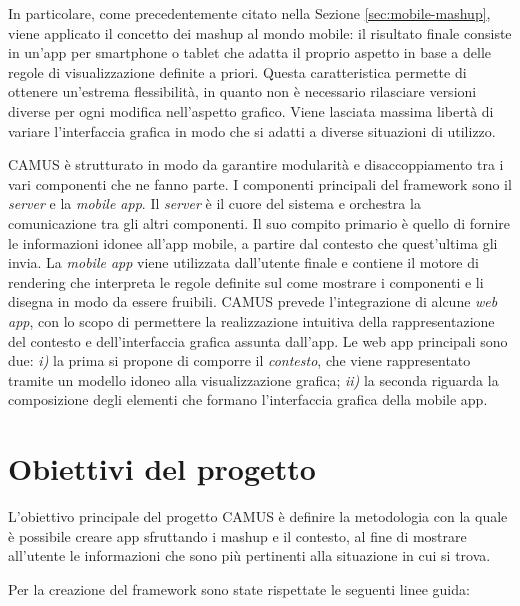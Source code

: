In particolare, come precedentemente citato nella Sezione \ref{sec:mobile-mashup}, viene applicato il concetto dei mashup al mondo mobile: il risultato finale consiste in un'app per smartphone o tablet che adatta il proprio aspetto in base a delle regole di visualizzazione definite a priori. Questa caratteristica permette di ottenere un'estrema flessibilità, in quanto non è necessario rilasciare versioni diverse per ogni modifica nell'aspetto grafico. Viene lasciata massima libertà di variare l'interfaccia grafica in modo che si adatti a diverse situazioni di utilizzo.

CAMUS è strutturato in modo da garantire modularità e disaccoppiamento tra i vari componenti che ne fanno parte. I componenti principali del framework sono il \emph{server} e la \emph{mobile app}. Il \emph{server} è il cuore del sistema e orchestra la comunicazione tra gli altri componenti. Il suo compito primario è quello di fornire le informazioni idonee all'app mobile, a partire dal contesto che quest'ultima gli invia. La \emph{mobile app} viene utilizzata dall'utente finale e contiene il motore di rendering che interpreta le regole definite sul come mostrare i componenti e li disegna in modo da essere fruibili.
CAMUS prevede l'integrazione di alcune \emph{web app}, con lo scopo di permettere la realizzazione intuitiva della rappresentazione del contesto e dell'interfaccia grafica assunta dall'app. Le web app principali sono due: \emph{i)} la prima si propone di comporre il \emph{contesto}, che viene rappresentato tramite un modello idoneo alla visualizzazione grafica; \emph{ii)} la seconda riguarda la composizione degli elementi che formano l'interfaccia grafica della mobile app.

\section{Obiettivi del progetto\label{sec:obiettivi-progetto}}

L'obiettivo principale del progetto CAMUS è definire la metodologia con la quale è possibile creare app sfruttando i mashup e il contesto, al fine di mostrare all'utente le informazioni che sono più pertinenti alla situazione in cui si trova.

Per la creazione del framework sono state rispettate le seguenti linee guida:


